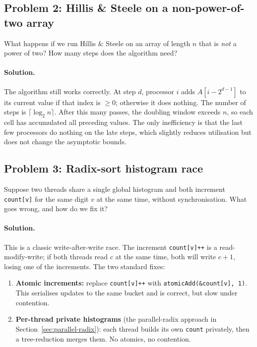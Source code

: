 \subsection{Problem 2: Hillis \& Steele on a non-power-of-two array}
What happens if we run Hillis \& Steele on an array of length $n$ that
is \emph{not} a power of two? How many steps does the algorithm need?

\paragraph{Solution.}
The algorithm still works correctly. At step $d$, processor $i$ adds
$A[i - 2^{d-1}]$ to its current value if that index is $\ge 0$;
otherwise it does nothing. The number of steps is
$\lceil \log_2 n \rceil$. After this many passes, the doubling window
exceeds $n$, so each cell has accumulated all preceding values. The
only inefficiency is that the last few processors do nothing on the
late steps, which slightly reduces utilisation but does not change the
asymptotic bounds.

\subsection{Problem 3: Radix-sort histogram race}
Suppose two threads share a single global histogram and both increment
\texttt{count[v]} for the same digit $v$ at the same time, without
synchronisation. What goes wrong, and how do we fix it?

\paragraph{Solution.}
This is a classic write-after-write race. The increment
\texttt{count[v]++} is a read-modify-write; if both threads read $c$
at the same time, both will write $c+1$, losing one of the increments.
The two standard fixes:
\begin{enumerate}[leftmargin=*]
  \item \textbf{Atomic increments:} replace \texttt{count[v]++} with
        \texttt{atomicAdd(\&count[v], 1)}. This serialises updates to
        the same bucket and is correct, but slow under contention.
  \item \textbf{Per-thread private histograms} (the parallel-radix
        approach in Section~\ref{sec:parallel-radix}): each thread
        builds its own \texttt{count} privately, then a tree-reduction
        merges them. No atomics, no contention.
\end{enumerate}

